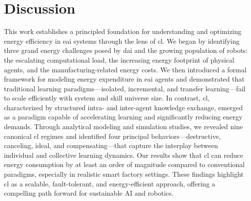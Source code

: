 \documentclass[12pt]{article}
\begin{document}
\section*{Discussion}\label{sec:discussion}

This work establishes a principled foundation for understanding and optimizing energy efficiency in \acl{eai} systems through the lens of \acl{cl}. We began by identifying three grand energy challenges posed by \ac{dai} and the growing population of robots: the escalating computational load, the increasing energy footprint of physical agents, and the manufacturing-related energy costs. We then introduced a formal framework for modeling energy expenditure in \ac{eai} agents and demonstrated that traditional learning paradigms---isolated, incremental, and transfer learning---fail to scale efficiently with system and skill universe size. In contrast, \acl{cl}, characterized by structured intra- and inter-agent knowledge exchange, emerged as a paradigm capable of accelerating learning and significantly reducing energy demands. Through analytical modeling and simulation studies, we revealed nine canonical \ac{cl} regimes and identified four principal behaviors---destructive, canceling, ideal, and compensating---that capture the interplay between individual and collective learning dynamics. Our results show that \ac{cl} can reduce energy consumption by at least an order of magnitude compared to conventional paradigms, especially in realistic smart factory settings. These findings highlight \ac{cl} as a scalable, fault-tolerant, and energy-efficient approach, offering a compelling path forward for sustainable AI and robotics.

\end{document}
